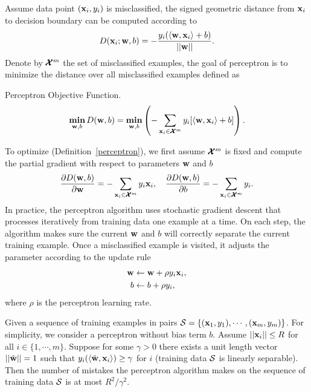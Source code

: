 {Assume data point $(\mathbf {x}_i,y_i)$ is misclassified, the signed geometric distance from $\mathbf {x}_i$ to decision boundary can be computed according to
\begin{align*}
	D(\mathbf {x}_i;\mathbf {w},b) = -\frac{y_i(\langle \mathbf {w}, \mathbf {x}_i \rangle+b)}{\left|\left| \mathbf {w} \right|\right|}.
\end{align*}
Denote by $\pmb {\mathcal{X}}^m$ the set of misclassified examples, the goal of perceptron is to minimize the distance over all misclassified examples defined as
\begin{definition}{Perceptron Objective Function.}\label{perceptron}
	\begin{align*}
		\underset{\mathbf {w},b}{\textbf{min}} \, D(\mathbf {w},b) = \underset{\mathbf {w},b}{\textbf{min}} \left( -\sum_{\mathbf {x}_i\in\pmb {\mathcal{X}}^{m}}y_i[\langle \mathbf {w}, \mathbf {x}_i \rangle+b]\right).
	\end{align*}
\end{definition}
To optimize (Definition~\ref{perceptron}), we first assume $\pmb {\mathcal{X}}^{m}$ is fixed and compute the partial gradient with respect to parameters $\mathbf {w}$ and $b$
\begin{align*}
	\frac{\partial D(\mathbf {w},b)}{\partial\mathbf {w}} = -\sum_{\mathbf {x}_i\in\pmb {\mathcal{X}}^m}{y_i\mathbf {x}_i},\quad
	\frac{\partial D(\mathbf {w},b)}{\partial b} = -\sum_{\mathbf {x}_i\in\pmb {\mathcal{X}}^m}{y_i}.
\end{align*}
In practice, the perceptron algorithm uses stochastic gradient descent that processes iteratively from training data one example at a time.
On each step, the algorithm makes sure the current $\mathbf {w}$ and $b$ will correctly separate the current training example. 
Once a misclassified example is visited, it adjusts the parameter according to the update rule
\begin{align*}
	\mathbf {w} &\leftarrow \mathbf {w} + \rho y_i \mathbf {x}_i,\\
	b &\leftarrow b + \rho y_i,
\end{align*}
where $\rho$ is the perceptron learning rate.
\begin{theory}\label{perceptron_theory}
	Given a sequence of training examples in pairs $\mathcal{S}=\{(\mathbf {x}_1,y_1),\cdots,(\mathbf {x}_m,y_m)\}$. 
	For simplicity, we consider a perceptron without bias term $b$.
	Assume $\left|\left| \mathbf {x}_i \right|\right|\le R$ for all $i\in\{1,\cdots,m\}$.
	Suppose for some $\gamma>0$ there exists a unit length vector $\left|\left| \hat{\mathbf {w}} \right|\right|=1$ such that $y_i(\langle \hat{\mathbf {w}}, \mathbf {x}_i \rangle)\ge\gamma$ for $i$ (training data $\mathcal{S}$ is linearly separable).
	Then the number of mistakes the perceptron algorithm makes on the sequence of training data $\mathcal{S}$ is at most ${R^2}/{\gamma^2}$.
\end{theory}
}
